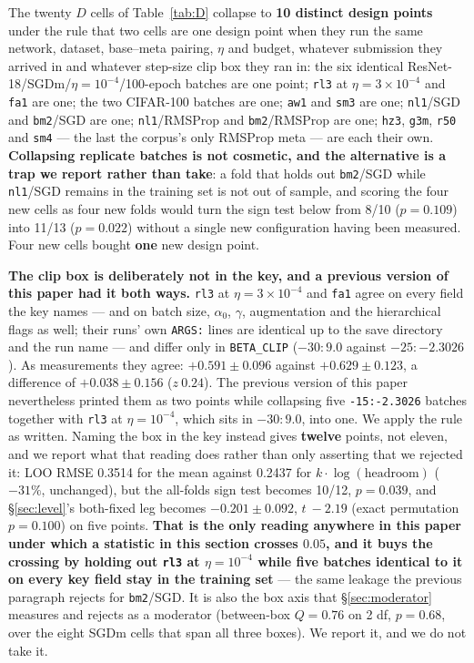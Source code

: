 \documentclass[10pt,letterpaper]{article}
\newcommand{\Dstat}{D}                         %
\newcommand{\arm}[1]{\texttt{#1}}
\begin{document}
The twenty $\Dstat$ cells of Table~\ref{tab:D} collapse to \textbf{10 distinct design points}
under the rule that two cells are one design point when they run the same network, dataset,
base--meta pairing, $\eta$ and budget, whatever submission they arrived in and whatever step-size
clip box they ran in: the six identical ResNet-18/SGDm/$\eta = 10^{-4}$/100-epoch batches are one
point; \arm{rl3} at $\eta = 3{\times}10^{-4}$ and \arm{fa1} are one; the two CIFAR-100 batches are
one; \arm{aw1} and \arm{sm3} are one; \arm{nl1}/SGD and \arm{bm2}/SGD are one;
\arm{nl1}/RMSProp and \arm{bm2}/RMSProp are one; \arm{hz3}, \arm{g3m}, \arm{r50} and \arm{sm4} ---
the last the corpus's only RMSProp meta --- are each their own. \textbf{Collapsing replicate
batches is not cosmetic, and the alternative is a trap we report rather than take}: a fold that
holds out \arm{bm2}/SGD while \arm{nl1}/SGD remains in the training set is not out of sample, and
scoring the four new cells as four new folds would turn the sign test below from 8/10
($p = 0.109$) into 11/13 ($p = 0.022$) without a single new configuration having been measured.
Four new cells bought \textbf{one} new design point.

\textbf{The clip box is deliberately not in the key, and a previous version of this paper had it
both ways.} \arm{rl3} at $\eta = 3{\times}10^{-4}$ and \arm{fa1} agree on every field the key
names --- and on batch size, $\alpha_0$, $\gamma$, augmentation and the hierarchical flags as well;
their runs' own \texttt{ARGS:} lines are identical up to the save directory and the run name --- and
differ only in \texttt{BETA\_CLIP} ($-30{:}9.0$ against $-25{:}{-}2.3026$). As measurements they
agree: $+0.591 \pm 0.096$ against $+0.629 \pm 0.123$, a difference of $+0.038 \pm 0.156$
($z\ 0.24$). The previous version of this paper nevertheless printed them as two points while
collapsing five \texttt{-15:-2.3026} batches together with \arm{rl3} at $\eta = 10^{-4}$, which
sits in $-30{:}9.0$, into one. We apply the rule as written. Naming the box in the key instead
gives \textbf{twelve} points, not eleven, and we report what that reading does rather than only
asserting that we rejected it: LOO RMSE 0.3514 for the mean against 0.2437 for
$k\cdot\log(\text{headroom})$ ($-31\%$, unchanged), but the all-folds sign test becomes 10/12,
$p = 0.039$, and \S\ref{sec:level}'s both-fixed leg becomes $-0.201 \pm 0.092$, $t\ -2.19$ (exact
permutation $p = 0.100$) on five points. \textbf{That is the only reading anywhere in this paper
under which a statistic in this section crosses $0.05$, and it buys the crossing by holding out
\arm{rl3} at $\eta = 10^{-4}$ while five batches identical to it on every key field stay in the
training set} --- the same leakage the previous paragraph rejects for \arm{bm2}/SGD. It is also
the box axis that \S\ref{sec:moderator} measures and rejects as a moderator (between-box
$Q = 0.76$ on 2 df, $p = 0.68$, over the eight SGDm cells that span all three boxes). We report
it, and we do not take it.
\end{document}
